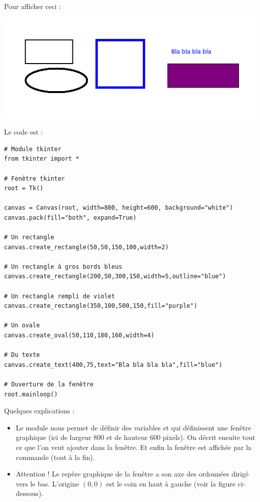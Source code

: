 \documentclass[11pt,class=report,crop=false]{standalone}
\begin{document}
\begin{cours}


Pour afficher ceci :
\begin{center}
\includegraphics[scale=\myscale,scale=0.6]{ecran-stat-cours-intro}
\end{center}
Le code est :
\begin{lstlisting}
# Module tkinter
from tkinter import *

# Fenêtre tkinter
root = Tk()
        
canvas = Canvas(root, width=800, height=600, background="white")
canvas.pack(fill="both", expand=True)

# Un rectangle
canvas.create_rectangle(50,50,150,100,width=2)

# Un rectangle à gros bords bleus
canvas.create_rectangle(200,50,300,150,width=5,outline="blue")

# Un rectangle rempli de violet
canvas.create_rectangle(350,100,500,150,fill="purple")

# Un ovale
canvas.create_oval(50,110,180,160,width=4)

# Du texte
canvas.create_text(400,75,text="Bla bla bla bla",fill="blue")

# Ouverture de la fenêtre
root.mainloop()
\end{lstlisting}


Quelques explications :
\begin{itemize}
  \item Le module  nous permet de définir des variables  et  qui définissent une fenêtre graphique (ici de largeur $800$ et de hauteur $600$ pixels).
  On décrit ensuite tout ce que l'on veut ajouter dans la fenêtre. Et enfin la fenêtre est affichée par la commande  (tout à la fin). 
  
    
  \item Attention ! Le repère graphique de la fenêtre a son axe des ordonnées dirigé vers le bas. L'origine $(0,0)$ est le coin en haut à gauche (voir la figure ci-dessous). 
  

\end{itemize}
\end{cours}
\end{document}
